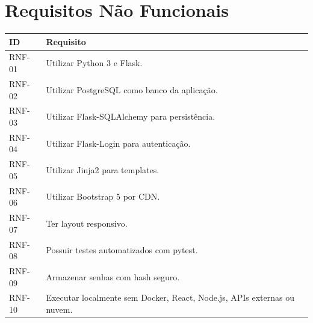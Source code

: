 \documentclass[12pt,a4paper]{article}
\begin{document}
\section{Requisitos Não Funcionais}
\begin{longtable}{|p{2cm}|p{12cm}|}
\hline
\textbf{ID} & \textbf{Requisito} \\ \hline
RNF-01 & Utilizar Python 3 e Flask. \\ \hline
RNF-02 & Utilizar PostgreSQL como banco da aplicação. \\ \hline
RNF-03 & Utilizar Flask-SQLAlchemy para persistência. \\ \hline
RNF-04 & Utilizar Flask-Login para autenticação. \\ \hline
RNF-05 & Utilizar Jinja2 para templates. \\ \hline
RNF-06 & Utilizar Bootstrap 5 por CDN. \\ \hline
RNF-07 & Ter layout responsivo. \\ \hline
RNF-08 & Possuir testes automatizados com pytest. \\ \hline
RNF-09 & Armazenar senhas com hash seguro. \\ \hline
RNF-10 & Executar localmente sem Docker, React, Node.js, APIs externas ou nuvem. \\ \hline
\end{longtable}
\end{document}

